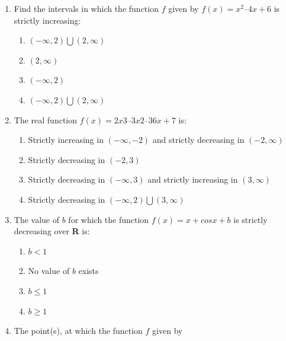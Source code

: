 \documentclass{article}
\begin{document}
\begin{enumerate}
\item Find the intervals in which the function $f$ given by $f(x) = x^2 – 4x + 6$ is strictly
increasing:

\begin{enumerate}

     \item $(-\infty,2) \bigcup (2,\infty)$ 
     
     \item $(2,\infty)$ 

     \item $(-\infty,2)$ 

     \item $(-\infty,2) \bigcup (2,\infty)$ 
\end{enumerate}


\newpage

\item The real function $f(x) = 2x3 – 3x2 – 36x + 7$ is:

\begin{enumerate}

     \item Strictly increasing in $(-\infty,-2)$ and strictly decreasing in $(-2,\infty)$
     
     \item Strictly decreasing in $(-2,3)$ 

     \item Strictly decreasing in $(-\infty,3)$ and strictly increasing in $(3,\infty)$ 

     \item Strictly decreasing in $(-\infty,2) \bigcup (3,\infty)$

\end{enumerate}


\item The value of $b$  for which the function $f(x) = x + cosx + b$ is strictly decreasing over \textbf{R} is:
\begin{enumerate}

     \item $b < 1$ 
     
     \item No value of $b$ exists 

     \item $b \leq 1$ 

     \item $b \geq 1$ 

\end{enumerate}

\item The point(s), at which the function $f$ given by  


\end{enumerate}
\end{document}
